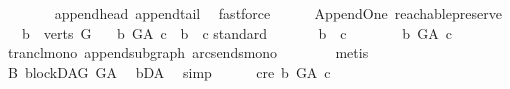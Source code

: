 \begin{isabellebody}
\ \ \ \ \ \ \isamarkupfalse%
\ append{\isacharunderscore}{\kern0pt}head\ append{\isacharunderscore}{\kern0pt}tail\ \isamarkupfalse%
\ fastforce\ \isanewline
\ \ \isamarkupfalse%
%
\endisatagproof
{\isafoldproof}%
%
\isadelimproof
\isanewline
%
\endisadelimproof
\isanewline
\isanewline
{}\isamarkupfalse%
\ {\isacharparenleft}{\kern0pt}\ Append{\isacharunderscore}{\kern0pt}One{\isacharparenright}{\kern0pt}\ reachable{}{\isacharunderscore}{\kern0pt}preserve{\isacharcolon}{\kern0pt}\isanewline
\ \ \ {\isachardoublequoteopen}b\ {\isasymin}\ verts\ G{\isachardoublequoteclose}\isanewline
\ \ \ {\isachardoublequoteopen}{\isacharparenleft}{\kern0pt}b\ {\isasymrightarrow}\isactrlsup {\isacharplus}{\kern0pt}\isactrlbsub G{\isacharunderscore}{\kern0pt}A\isactrlesub \ c{\isacharparenright}{\kern0pt}\ {\isasymlongleftrightarrow}\ b\ {\isasymrightarrow}\isactrlsup {\isacharplus}{\kern0pt}\ c{\isachardoublequoteclose}\isanewline
%
\isadelimproof
%
\endisadelimproof
%
\isatagproof
{}\isamarkupfalse%
{\isacharparenleft}{\kern0pt}standard{\isacharparenright}{\kern0pt}\isanewline
\ \ \ \ \isamarkupfalse%
\ \ {\isachardoublequoteopen}b\ {\isasymrightarrow}\isactrlsup {\isacharplus}{\kern0pt}\ c{\isachardoublequoteclose}\isanewline
\ \ \ \ \isamarkupfalse%
\ \isamarkupfalse%
\ {\isachardoublequoteopen}b\ {\isasymrightarrow}\isactrlsup {\isacharplus}{\kern0pt}\isactrlbsub G{\isacharunderscore}{\kern0pt}A\isactrlesub \ c{\isachardoublequoteclose}\isanewline
\ \ \ \ \ \ \isamarkupfalse%
\ trancl{\isacharunderscore}{\kern0pt}mono\ append{\isacharunderscore}{\kern0pt}subgraph\ arcs{\isacharunderscore}{\kern0pt}ends{\isacharunderscore}{\kern0pt}mono\isanewline
\ \ \ \ \ \ \isamarkupfalse%
\ {\isacharparenleft}{\kern0pt}metis{\isacharparenright}{\kern0pt}\ \ \isanewline
\ \ \isamarkupfalse%
\ \isanewline
\ \ \ \ \isamarkupfalse%
\ B{}{\isacharcolon}{\kern0pt}\ blockDAG\ {\isachardoublequoteopen}G{\isacharunderscore}{\kern0pt}A{\isachardoublequoteclose}\ \isamarkupfalse%
\ bD{\isacharunderscore}{\kern0pt}A\ \isamarkupfalse%
\ simp\isanewline
\ \ \ \ \isamarkupfalse%
\ c{\isacharunderscore}{\kern0pt}re{\isacharcolon}{\kern0pt}\ {\isachardoublequoteopen}b\ {\isasymrightarrow}\isactrlsup {\isacharplus}{\kern0pt}\isactrlbsub G{\isacharunderscore}{\kern0pt}A\isactrlesub \ c{\isachardoublequoteclose}\isanewline

\end{isabellebody}
